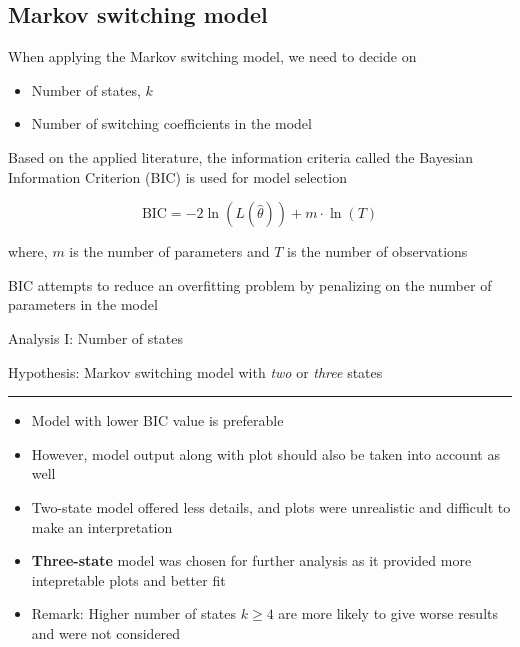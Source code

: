 \documentclass{beamer}
\begin{document}
\subsection{Markov switching model}
\begin{frame}
When applying the Markov switching model, we need to decide on
\begin{itemize}
\item Number of states, $k$
\item Number of switching coefficients in the model
\end{itemize}
\vspace{1em}

Based on the applied literature, the information criteria called the Bayesian Information Criterion (BIC) is used for model selection

$$\mathrm{BIC}=-2\ln(L(\hat{\theta}))+m\cdot\ln(T)$$

\footnotesize{where, $m$ is the number of parameters and $T$ is the number of observations}
\vspace{1em}

\normalsize{BIC attempts to reduce an overfitting problem by penalizing on the number of parameters in the model}

\end{frame}

\begin{frame}

Analysis I: Number of states

Hypothesis: Markov switching model with \textit{two} or \textit{three} states
\rule{\textwidth}{0.4pt}

\begin{itemize}
\item Model with lower BIC value is preferable
\item However, model output along with plot should also be taken into account as well
\pause
\item Two-state model offered less details, and plots were unrealistic and difficult to make an interpretation
\item \textbf{Three-state} model was chosen for further analysis as it provided more intepretable plots and better fit
\item \small{Remark: Higher number of states $k\geq4$ are more likely to give worse results and were not considered}
\end{itemize}

\end{frame}
\end{document}
